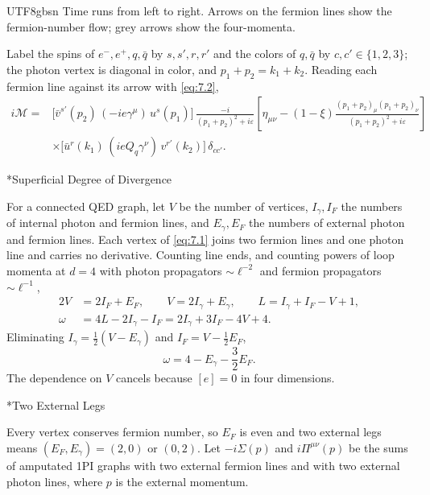 \documentclass[11pt,a4paper,oneside]{report}
\makeatletter
\newcommand\topic{\@startsection{paragraph}{4}{\z@}{-1.7ex plus -.3ex}{.5ex}{\normalfont\normalsize\bfseries\itshape\boldmath}*}
\makeatother
\begin{document}
\begin{CJK*}{UTF8}{gbsn}
Time runs from left to right. Arrows on the fermion lines show the fermion-number flow; grey arrows show the four-momenta.

Label the spins of $e^-,e^+,q,\bar q$ by $s,s',r,r'$ and the colors of $q,\bar q$ by $c,c'\in\{1,2,3\}$; the photon vertex is diagonal in color, and $p_1+p_2=k_1+k_2$. Reading each fermion line against its arrow with \eqref{eq:7.2},
\begin{equation*}
\begin{aligned}
i\mathcal M
={}&\bigl[\bar v^{s'}(p_2)\,(-ie\gamma^\mu)\,u^s(p_1)\bigr]\,
\frac{-i}{(p_1+p_2)^2+i\varepsilon}
\left[\eta_{\mu\nu}-(1-\xi)\frac{(p_1+p_2)_\mu(p_1+p_2)_\nu}{(p_1+p_2)^2+i\varepsilon}\right]\\[6pt]
&\times\bigl[\bar u^r(k_1)\,(ieQ_q\gamma^\nu)\,v^{r'}(k_2)\bigr]\,\delta_{cc'} .
\end{aligned}
\tag{7.3}\label{eq:7.3}
\end{equation*}

\topic{Superficial Degree of Divergence}

For a connected QED graph, let $V$ be the number of vertices, $I_\gamma,I_F$ the numbers of internal photon and fermion lines, and $E_\gamma,E_F$ the numbers of external photon and fermion lines. Each vertex of \eqref{eq:7.1} joins two fermion lines and one photon line and carries no derivative. Counting line ends, and counting powers of loop momenta at $d=4$ with photon propagators $\sim\ell^{-2}$ and fermion propagators $\sim\ell^{-1}$,
\begin{equation*}
\begin{aligned}
2V&=2I_F+E_F,\qquad V=2I_\gamma+E_\gamma,\qquad L=I_\gamma+I_F-V+1,\\[6pt]
\omega&=4L-2I_\gamma-I_F=2I_\gamma+3I_F-4V+4 .
\end{aligned}
\tag{7.4}\label{eq:7.4}
\end{equation*}
Eliminating $I_\gamma=\tfrac12(V-E_\gamma)$ and $I_F=V-\tfrac12E_F$,
\begin{equation*}
{\displaystyle \omega=4-E_\gamma-\frac32E_F .}
\tag{7.5}\label{eq:7.5}
\end{equation*}
The dependence on $V$ cancels because $[e]=0$ in four dimensions.

\topic{Two External Legs}

Every vertex conserves fermion number, so $E_F$ is even and two external legs means $(E_F,E_\gamma)=(2,0)$ or $(0,2)$. Let $-i\Sigma(p)$ and $i\Pi^{\mu\nu}(p)$ be the sums of amputated 1PI graphs with two external fermion lines and with two external photon lines, where $p$ is the external momentum.


\end{CJK*}
\end{document}
